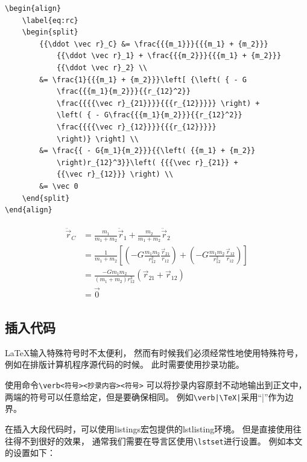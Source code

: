 \documentclass{ctexart}
\numberwithin{equation}{section}			%
\begin{document}
\begin{lstlisting}
\begin{align}
	\label{eq:rc}
	\begin{split}
		{{\ddot \vec r}_C} &= \frac{{{m_1}}}{{{m_1} + {m_2}}}
			{{\ddot \vec r}_1} + \frac{{{m_2}}}{{{m_1} + {m_2}}}
			{{\ddot \vec r}_2} \\ 
		&= \frac{1}{{{m_1} + {m_2}}}\left[ {\left( { - G
			\frac{{{m_1}{m_2}}}{{r_{12}^2}}
			\frac{{{{\vec r}_{21}}}}{{{r_{12}}}}} \right) + 
			\left( { - G\frac{{{m_1}{m_2}}}{{r_{12}^2}}
			\frac{{{{\vec r}_{12}}}}{{{r_{12}}}}} 
			\right)} \right] \\ 
		&= \frac{{ - G{m_1}{m_2}}}{{\left( {{m_1} + {m_2}}
			\right)r_{12}^3}}\left( {{{\vec r}_{21}} + 
			{{\vec r}_{12}}} \right) \\ 
		&= \vec 0 
	\end{split}
\end{align}
\end{lstlisting}
	\begin{align}
		\label{eq:rc}
		\begin{split}
			{{\ddot \vec r}_C} &= \frac{{{m_1}}}{{{m_1} + {m_2}}}
			{{\ddot \vec r}_1} + \frac{{{m_2}}}{{{m_1} + {m_2}}}
			{{\ddot \vec r}_2} \\ 
			&= \frac{1}{{{m_1} + {m_2}}}\left[ {\left( { - G
				\frac{{{m_1}{m_2}}}{{r_{12}^2}}
				\frac{{{{\vec r}_{21}}}}{{{r_{12}}}}} \right) + 
				\left( { - G\frac{{{m_1}{m_2}}}{{r_{12}^2}}
				\frac{{{{\vec r}_{12}}}}{{{r_{12}}}}} 
				\right)} \right] \\ 
			&= \frac{{ - G{m_1}{m_2}}}{{\left( {{m_1} + {m_2}}
				\right)r_{12}^3}}\left( {{{\vec r}_{21}} + 
				{{\vec r}_{12}}} \right) \\ 
			&= \vec 0 
		\end{split}
	\end{align}
	
	\subsection{插入代码}
	\LaTeX 输入特殊符号时不太便利，
	然而有时候我们必须经常性地使用特殊符号，
	例如在排版计算机程序源代码的时候。
	此时需要使用抄录功能。
	
	使用命令\verb|\verb<符号><抄录内容><符号>|
	可以将抄录内容原封不动地输出到正文中，
	两端的符号可以任意给定，但是要确保相同。
	例如\verb~\verb|\TeX|~采用“|”作为边界。
	
	在插入大段代码时，可以使用listings宏包提供的lstlisting环境。
	但是直接使用往往得不到很好的效果，
	通常我们需要在导言区使用\verb|\lstset|进行设置。
	例如本文的设置如下：
\end{document}
